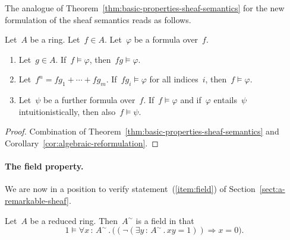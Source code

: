 \documentclass{ws-rv9x6}
\renewcommand{\_}{\mathpunct{.}}
\newcommand{\?}{\,{:}\,}
\begin{document}
The analogue of Theorem~\ref{thm:basic-properties-sheaf-semantics} for the new
formulation of the sheaf semantics reads as follows.

\begin{theorem}\label{thm:basic-properties-sheaf-semantics-algebraic}
Let~$A$ be a ring. Let~$f \in A$. Let~$\varphi$ be a formula over~$f$.
\begin{enumerate}
\item Let~$g \in A$. If~$f \models \varphi$, then~$fg \models \varphi$.
\item Let~$f^n = fg_1 + \cdots + fg_m$. If~$fg_i \models \varphi$ for all
indices~$i$, then~$f \models \varphi$.
\item Let~$\psi$ be a further formula over~$f$. If~$f \models
\varphi$ and if~$\varphi$ entails~$\psi$ intuitionistically, then also~$f
\models \psi$.
\end{enumerate}
\end{theorem}

\begin{proof}Combination of Theorem~\ref{thm:basic-properties-sheaf-semantics}
and Corollary~\ref{cor:algebraic-reformulation}.\end{proof}


\paragraph{The field property.} We are now in a position to verify
statement~(\ref{item:field}) of Section~\ref{sect:a-remarkable-sheaf}.

\begin{proposition}\label{prop:field-property}
Let~$A$ be a reduced ring. Then~$A^\sim$ is a field in that
\[ 1 \models \forall x\?A^\sim\_ \bigl((\neg(\exists y\?A^\sim\_ xy = 1)) \Rightarrow
x = 0\bigr). \]
\end{proposition}
\end{document}
